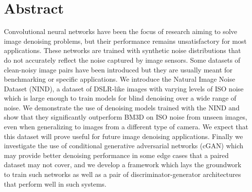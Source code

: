 \begingroup
\let\clearpage\relax
\let\cleardoublepage\relax
\let\cleardoublepage\relax

\chapter*{Abstract}


Convolutional neural networks have been the focus of research aiming to solve image denoising problems, but their performance remains unsatisfactory for most applications. These networks are trained with synthetic noise distributions that do not accurately reflect the noise captured by image sensors. Some datasets of clean-noisy image pairs have been introduced but they are usually meant for benchmarking or specific applications. We introduce the Natural Image Noise Dataset (NIND), a dataset of DSLR-like images with varying levels of ISO noise which is large enough to train models for blind denoising over a wide range of noise. We demonstrate the use of denoising models trained with the NIND and show that they significantly outperform BM3D on ISO noise from unseen images, even when generalizing to images from a different type of camera. We expect that this dataset will prove useful for future image denoising applications. Finally we investigate the use of conditional generative adversarial networks (cGAN) which may provide better denoising performance in some edge cases that a paired dataset may not cover, and we develop a framework which lays the groundwork to train such networks as well as a pair of discriminator-generator architectures that perform well in such systems.


\vfill


\endgroup

\vfill
